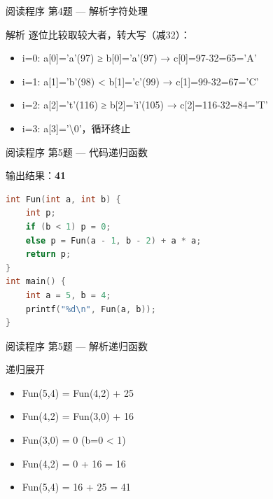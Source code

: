 \begin{frame}{阅读程序 第4题 --- 解析}{字符处理}
    \begin{alertblock}{解析}
        \footnotesize 逐位比较取较大者，转大写（减32）：
        \begin{itemize}
            \setlength{\itemsep}{0pt}
            \item i=0: a[0]='a'(97) ≥ b[0]='a'(97) → c[0]=97-32=65='A'
            \item i=1: a[1]='b'(98) < b[1]='c'(99) → c[1]=99-32=67='C'
            \item i=2: a[2]='t'(116) ≥ b[2]='i'(105) → c[2]=116-32=84='T'
            \item i=3: a[3]='\textbackslash 0'，循环终止
        \end{itemize}
    \end{alertblock}
\end{frame}

\begin{frame}[fragile]{阅读程序 第5题 — 代码}{递归函数}
    \begin{exampleblock}{输出结果：\textbf{41}}
    \end{exampleblock}
    \begin{lstlisting}[language=C,basicstyle=\scriptsize\ttfamily]
int Fun(int a, int b) {
    int p;
    if (b < 1) p = 0;
    else p = Fun(a - 1, b - 2) + a * a;
    return p;
}
int main() {
    int a = 5, b = 4;
    printf("%d\n", Fun(a, b));
}
\end{lstlisting}
\end{frame}

\begin{frame}[fragile]{阅读程序 第5题 — 解析}{递归函数}
    \begin{alertblock}{递归展开}
        \footnotesize
        \begin{itemize}
            \setlength{\itemsep}{0pt}
            \item Fun(5,4) = Fun(4,2) + 25
            \item Fun(4,2) = Fun(3,0) + 16
            \item Fun(3,0) = 0 \quad (b=0 < 1)
            \item Fun(4,2) = 0 + 16 = 16
            \item Fun(5,4) = 16 + 25 = 41
        \end{itemize}
    \end{alertblock}
\end{frame}